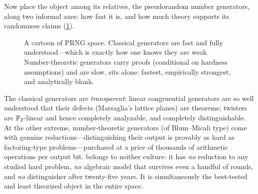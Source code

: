 Now place the object among its relatives, the pseudorandom number
generators, along two informal axes: how fast it is, and how much theory
supports its randomness claims (\cref{fig:prngspace}).

\begin{figure}[ht]
  \centering
  \caption{A cartoon of PRNG space. Classical generators are fast and
  fully understood---which is exactly how one knows they are weak.
  Number-theoretic generators carry proofs (conditional on hardness
  assumptions) and are slow. \SHA{} sits alone: fastest, empirically
  strongest, and analytically blank.}
  \label{fig:prngspace}
\end{figure}

The classical generators are \emph{transparent}: linear congruential
generators are so well understood that their defects (Marsaglia's
lattice planes) are theorems; twisters are $\mathbb{F}_2$-linear and hence
completely analyzable, and completely distinguishable. At the other
extreme, number-theoretic generators (of Blum--Micali type) come with
genuine reductions---distinguishing their output is provably as hard as
factoring-type problems---purchased at a price of thousands of arithmetic
operations per output bit. \SHA{} belongs to neither culture: it has
\emph{no} reduction to any studied hard problem, \emph{no} algebraic
model that survives even a handful of rounds, and \emph{no} distinguisher
after twenty-five years. It is simultaneously the best-tested and least
theorized object in the entire space.

